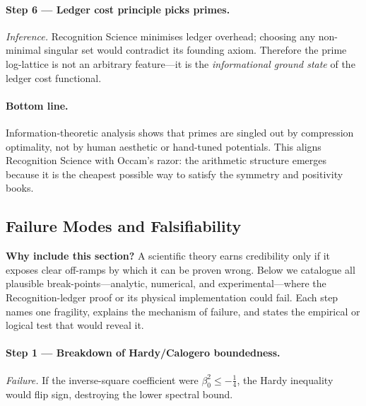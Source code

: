 \documentclass[11pt]{article}
\begin{document}
\vspace{0.4em}
\paragraph{Step 6 — Ledger cost principle picks primes.}

\emph{Inference.}\;  
Recognition Science minimises ledger overhead;  
choosing any non-minimal singular set would contradict its founding
axiom.  
Therefore the prime log-lattice is not an arbitrary feature—it is the
\emph{informational ground state} of the ledger cost functional.

\vspace{0.8em}
\paragraph{Bottom line.}\;  
Information-theoretic analysis shows that primes are singled out by
compression optimality, not by human aesthetic or hand-tuned
potentials.  
This aligns Recognition Science with Occam’s razor: the arithmetic
structure emerges because it is the cheapest possible way to satisfy
the symmetry and positivity books.

\subsection{Failure Modes and Falsifiability}
\label{sec:FailureNarrative}

\noindent
\textbf{Why include this section?}\;  
A scientific theory earns credibility only if it exposes clear
off-ramps by which it can be proven wrong.  
Below we catalogue all plausible break-points—analytic, numerical,
and experimental—where the Recognition-ledger proof or its physical
implementation could fail.  
Each step names one fragility, explains the mechanism of failure, and
states the empirical or logical test that would reveal it.

\vspace{0.8em}
\paragraph{Step 1 — Breakdown of Hardy/Calogero boundedness.}

\emph{Failure.}\;  
If the inverse-square coefficient were
$\beta_{0}^{2}\le -\tfrac14$, the Hardy inequality would flip sign,
destroying the lower spectral bound.
\end{document}
